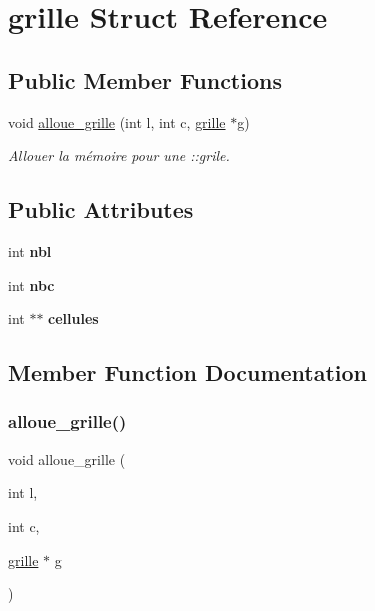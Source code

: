 \hypertarget{structgrille}{}\section{grille Struct Reference}
\label{structgrille}
\subsection*{Public Member Functions}
\begin{DoxyCompactItemize}
\item 
void \hyperlink{structgrille_ae621f51c60aa4fafaa0c9f6c9b5a4036}{alloue\+\_\+grille} (int l, int c, \hyperlink{structgrille}{grille} $\ast$g)
\begin{DoxyCompactList}\small\item\em Allouer la mémoire pour une \+::grile. \end{DoxyCompactList}\end{DoxyCompactItemize}
\subsection*{Public Attributes}
\begin{DoxyCompactItemize}
\item 
\mbox{\label{structgrille_a0b4da1e205825df205b0c004d105d62a}} 
int {\bfseries nbl}
\item 
\mbox{\label{structgrille_a48d6706d41bee6fff9200d872b8b0cd0}} 
int {\bfseries nbc}
\item 
\mbox{\label{structgrille_a428cf0c0297ce04e0206ba0067ac3b42}} 
int $\ast$$\ast$ {\bfseries cellules}
\end{DoxyCompactItemize}


\subsection{Member Function Documentation}
\mbox{\label{structgrille_ae621f51c60aa4fafaa0c9f6c9b5a4036}} 
\subsubsection{\texorpdfstring{alloue\+\_\+grille()}{alloue\_grille()}}
{\footnotesize\ttfamily void alloue\+\_\+grille (\begin{DoxyParamCaption}\item[{int}]{l,  }\item[{int}]{c,  }\item[{\hyperlink{structgrille}{grille} $\ast$}]{g }\end{DoxyParamCaption})}



